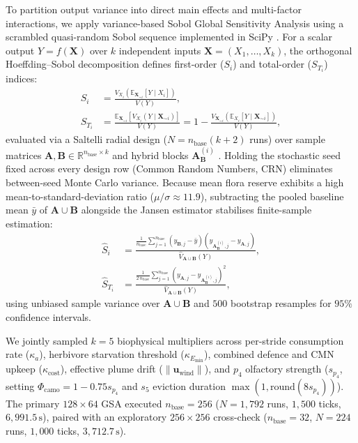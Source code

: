 To partition output variance into direct main effects and multi-factor interactions, we apply variance-based Sobol Global Sensitivity Analysis \cite{saltelli2010variance} using a scrambled quasi-random Sobol sequence implemented in SciPy \cite{virtanen2020scipy}. For a scalar output $Y = f(\mathbf{X})$ over $k$ independent inputs $\mathbf{X} = (X_1, \dots, X_k)$, the orthogonal Hoeffding--Sobol decomposition defines first-order ($S_i$) and total-order ($S_{T_i}$) indices:
\begin{align}
  S_i &= \frac{V_{X_i}\!\left(\mathbb{E}_{\mathbf{X}_{\sim i}}[Y \mid X_i]\right)}{V(Y)}, \nonumber \\
  S_{T_i} &= \frac{\mathbb{E}_{\mathbf{X}_{\sim i}}\!\left[V_{X_i}(Y \mid \mathbf{X}_{\sim i})\right]}{V(Y)} = 1 - \frac{V_{\mathbf{X}_{\sim i}}\!\left(\mathbb{E}_{X_i}[Y \mid \mathbf{X}_{\sim i}]\right)}{V(Y)},
  \label{eq:sobol_def}
\end{align}
evaluated via a Saltelli radial design ($N = n_{\text{base}}(k + 2)$ runs) over sample matrices $\mathbf{A}, \mathbf{B} \in \mathbb{R}^{n_{\text{base}} \times k}$ and hybrid blocks $\mathbf{A}_{\mathbf{B}}^{(i)}$ \cite{saltelli2010variance}. Holding the stochastic seed fixed across every design row (Common Random Numbers, CRN) eliminates between-seed Monte Carlo variance. Because mean flora reserve exhibits a high mean-to-standard-deviation ratio ($\mu / \sigma \approx 11.9$), subtracting the pooled baseline mean $\bar{y}$ of $\mathbf{A} \cup \mathbf{B}$ alongside the Jansen estimator \cite{jansen1999analysis} stabilises finite-sample estimation:
\begin{align}
  \hat{S}_i &= \frac{\frac{1}{n_{\mathrm{base}}}\sum_{j=1}^{n_{\mathrm{base}}} \left(y_{\mathbf{B},j} - \bar{y}\right)\left(y_{\mathbf{A}_{\mathbf{B}}^{(i)},j} - y_{\mathbf{A},j}\right)}{\widehat{V}_{\mathbf{A}\cup\mathbf{B}}(Y)}, \nonumber \\
  \hat{S}_{T_i} &= \frac{\frac{1}{2\,n_{\mathrm{base}}}\sum_{j=1}^{n_{\mathrm{base}}} \left(y_{\mathbf{A},j} - y_{\mathbf{A}_{\mathbf{B}}^{(i)},j}\right)^2}{\widehat{V}_{\mathbf{A}\cup\mathbf{B}}(Y)},
  \label{eq:sobol_estimators}
\end{align}
using unbiased sample variance over $\mathbf{A} \cup \mathbf{B}$ and $500$ bootstrap resamples for $95\%$ confidence intervals.

We jointly sampled $k = 5$ biophysical multipliers across per-stride consumption rate ($\kappa_a$), herbivore starvation threshold ($\kappa_{E_{\min}}$), combined defence and CMN upkeep ($\kappa_{\mathrm{cost}}$), effective plume drift ($\|\mathbf{u}_{\text{wind}}\|$), and $p_4$ olfactory strength ($s_{p_4}$, setting $\Phi_{\text{camo}} = 1 - 0.75 s_{p_4}$ and $s_5$ eviction duration $\max(1, \mathrm{round}(8 s_{p_4}))$). The primary $128 \times 64$ GSA executed $n_{\text{base}} = 256$ ($N = 1{,}792$ runs, $1{,}500$ ticks, $6{,}991.5\,\text{s}$), paired with an exploratory $256 \times 256$ cross-check ($n_{\text{base}} = 32$, $N = 224$ runs, $1{,}000$ ticks, $3{,}712.7\,\text{s}$).

